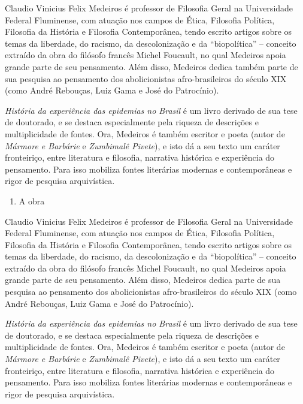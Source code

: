 Claudio Vinicius Felix Medeiros é professor de Filosofia Geral na
Universidade Federal Fluminense, com atuação nos campos de Ética,
Filosofia Política, Filosofia da História e Filosofia Contemporânea,
tendo escrito artigos sobre os temas da liberdade, do racismo, da
descolonização e da ``biopolítica'' -- conceito extraído da obra do
filósofo francês Michel Foucault, no qual Medeiros apoia grande parte de
seu pensamento. Além disso, Medeiros dedica também parte de sua pesquisa
ao pensamento dos abolicionistas afro-brasileiros do século XIX (como
André Rebouças, Luiz Gama e José do Patrocínio).

\emph{História da experiência das epidemias no Brasil} é um livro
derivado de sua tese de doutorado, e se destaca especialmente pela
riqueza de descrições e multiplicidade de fontes. Ora, Medeiros é também
escritor e poeta (autor de \emph{Mármore e Barbárie} e \emph{Zumbimalê
Pivete}), e isto dá a seu texto um caráter fronteiriço, entre literatura
e filosofia, narrativa histórica e experiência do pensamento. Para isso
mobiliza fontes literárias modernas e contemporâneas e rigor de pesquisa
arquivística.

\begin{enumerate}
\def\labelenumi{\arabic{enumi}.}
\setcounter{enumi}{11}
\tightlist
\item
  A obra
\end{enumerate}

Claudio Vinicius Felix Medeiros é professor de Filosofia Geral na
Universidade Federal Fluminense, com atuação nos campos de Ética,
Filosofia Política, Filosofia da História e Filosofia Contemporânea,
tendo escrito artigos sobre os temas da liberdade, do racismo, da
descolonização e da ``biopolítica'' -- conceito extraído da obra do
filósofo francês Michel Foucault, no qual Medeiros apoia grande parte de
seu pensamento. Além disso, Medeiros dedica parte de sua pesquisa ao
pensamento dos abolicionistas afro-brasileiros do século XIX (como André
Rebouças, Luiz Gama e José do Patrocínio).

\emph{História da experiência das epidemias no Brasil} é um livro
derivado de sua tese de doutorado, e se destaca especialmente pela
riqueza de descrições e multiplicidade de fontes. Ora, Medeiros é também
escritor e poeta (autor de \emph{Mármore e Barbárie} e \emph{Zumbimalê
Pivete}), e isto dá a seu texto um caráter fronteiriço, entre literatura
e filosofia, narrativa histórica e experiência do pensamento. Para isso
mobiliza fontes literárias modernas e contemporâneas e rigor de pesquisa
arquivística.


